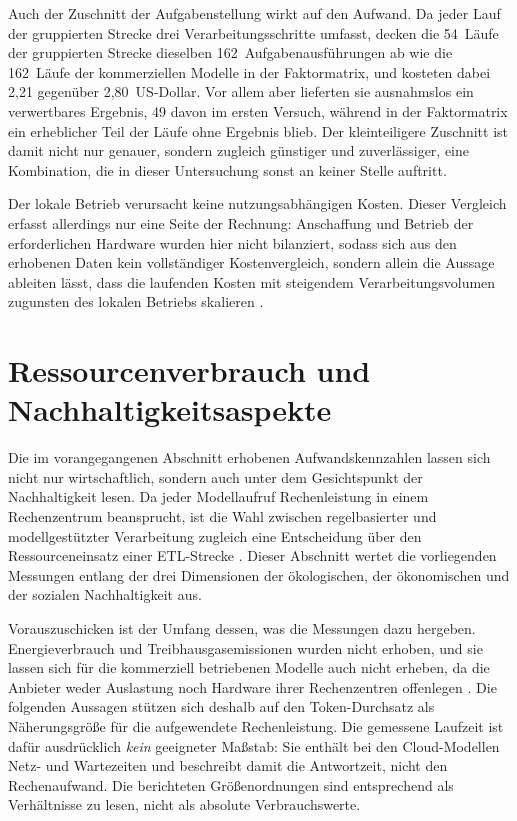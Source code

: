 Auch der Zuschnitt der Aufgabenstellung wirkt auf den Aufwand. Da jeder Lauf der gruppierten Strecke drei Verarbeitungsschritte umfasst, decken die 54~Läufe der gruppierten Strecke dieselben 162~Aufgabenausführungen ab wie die 162~Läufe der kommerziellen Modelle in der Faktormatrix, und kosteten dabei 2,21 gegenüber 2,80~US-Dollar. Vor allem aber lieferten sie ausnahmslos ein verwertbares Ergebnis, 49 davon im ersten Versuch, während in der Faktormatrix ein erheblicher Teil der Läufe ohne Ergebnis blieb. Der kleinteiligere Zuschnitt ist damit nicht nur genauer, sondern zugleich günstiger und zuverlässiger, eine Kombination, die in dieser Untersuchung sonst an keiner Stelle auftritt.

Der lokale Betrieb verursacht keine nutzungsabhängigen Kosten. Dieser Vergleich erfasst allerdings nur eine Seite der Rechnung: Anschaffung und Betrieb der erforderlichen Hardware wurden hier nicht bilanziert, sodass sich aus den erhobenen Daten kein vollständiger Kostenvergleich, sondern allein die Aussage ableiten lässt, dass die laufenden Kosten mit steigendem Verarbeitungsvolumen zugunsten des lokalen Betriebs skalieren \autocite{zhaoSurveyLargeLanguage2026,2026AIIndex}.

\section{Ressourcenverbrauch und Nachhaltigkeitsaspekte}
\label{sec:nachhaltigkeit}

Die im vorangegangenen Abschnitt erhobenen Aufwandskennzahlen lassen sich nicht nur wirtschaftlich, sondern auch unter dem Gesichtspunkt der Nachhaltigkeit lesen. Da jeder Modellaufruf Rechenleistung in einem Rechenzentrum beansprucht, ist die Wahl zwischen regelbasierter und modellgestützter Verarbeitung zugleich eine Entscheidung über den Ressourceneinsatz einer \ac{ETL}-Strecke \autocite{2026AIIndex,changEfficientPromptingMethods2024}. Dieser Abschnitt wertet die vorliegenden Messungen entlang der drei Dimensionen der ökologischen, der ökonomischen und der sozialen Nachhaltigkeit aus.

Vorauszuschicken ist der Umfang dessen, was die Messungen dazu hergeben. Energieverbrauch und Treibhausgasemissionen wurden nicht erhoben, und sie lassen sich für die kommerziell betriebenen Modelle auch nicht erheben, da die Anbieter weder Auslastung noch Hardware ihrer Rechenzentren offenlegen \autocite{2026AIIndex,zhaoSurveyLargeLanguage2026}. Die folgenden Aussagen stützen sich deshalb auf den Token-Durchsatz als Näherungsgröße für die aufgewendete Rechenleistung. Die gemessene Laufzeit ist dafür ausdrücklich \emph{kein} geeigneter Maßstab: Sie enthält bei den Cloud-Modellen Netz- und Wartezeiten und beschreibt damit die Antwortzeit, nicht den Rechenaufwand. Die berichteten Größenordnungen sind entsprechend als Verhältnisse zu lesen, nicht als absolute Verbrauchswerte.

